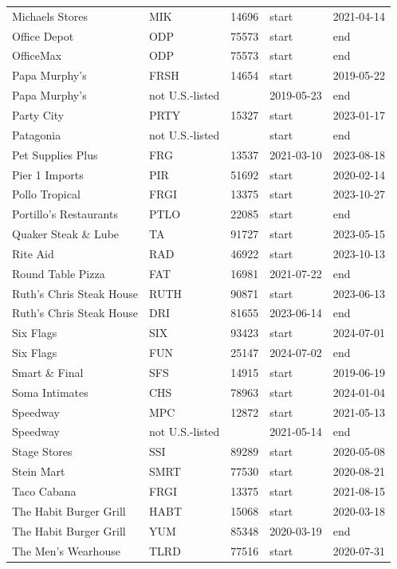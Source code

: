\begin{longtable}{>{\raggedright\arraybackslash}p{5.2cm}lrll}
Michaels Stores & MIK & 14696 & start & 2021-04-14 \\
Office Depot & ODP & 75573 & start & end \\
OfficeMax & ODP & 75573 & start & end \\
Papa Murphy's & FRSH & 14654 & start & 2019-05-22 \\
Papa Murphy's & not U.S.-listed &  & 2019-05-23 & end \\
Party City & PRTY & 15327 & start & 2023-01-17 \\
Patagonia & not U.S.-listed &  & start & end \\
Pet Supplies Plus & FRG & 13537 & 2021-03-10 & 2023-08-18 \\
Pier 1 Imports & PIR & 51692 & start & 2020-02-14 \\
Pollo Tropical & FRGI & 13375 & start & 2023-10-27 \\
Portillo's Restaurants & PTLO & 22085 & start & end \\
Quaker Steak \& Lube & TA & 91727 & start & 2023-05-15 \\
Rite Aid & RAD & 46922 & start & 2023-10-13 \\
Round Table Pizza & FAT & 16981 & 2021-07-22 & end \\
Ruth's Chris Steak House & RUTH & 90871 & start & 2023-06-13 \\
Ruth's Chris Steak House & DRI & 81655 & 2023-06-14 & end \\
Six Flags & SIX & 93423 & start & 2024-07-01 \\
Six Flags & FUN & 25147 & 2024-07-02 & end \\
Smart \& Final & SFS & 14915 & start & 2019-06-19 \\
Soma Intimates & CHS & 78963 & start & 2024-01-04 \\
Speedway & MPC & 12872 & start & 2021-05-13 \\
Speedway & not U.S.-listed &  & 2021-05-14 & end \\
Stage Stores & SSI & 89289 & start & 2020-05-08 \\
Stein Mart & SMRT & 77530 & start & 2020-08-21 \\
Taco Cabana & FRGI & 13375 & start & 2021-08-15 \\
The Habit Burger Grill & HABT & 15068 & start & 2020-03-18 \\
The Habit Burger Grill & YUM & 85348 & 2020-03-19 & end \\
The Men's Wearhouse & TLRD & 77516 & start & 2020-07-31 \\

\end{longtable}
